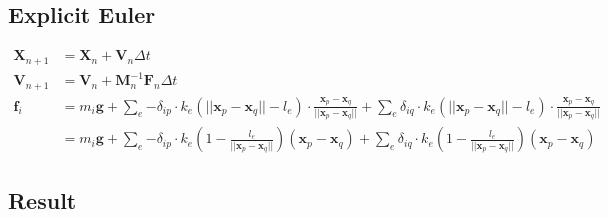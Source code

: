 \documentclass{article}
\begin{document}
\subsection*{Explicit Euler}
\begin{equation*}
  \begin{aligned}
    \bm{X}_{n+1} &= \bm{X}_n + \bm{V}_n\Delta t \\
    \bm{V}_{n+1} &= \bm{V}_n + \bm{M}_n^{-1}\bm{F}_n\Delta t \\
    \bm{f}_i &= m_i\bm{g} + \sum_e{-\delta_{ip}\cdot k_e(||\bm{x}_p-\bm{x}_q|| - l_e)\cdot \frac{\bm{x}_p-\bm{x}_q}{||\bm{x}_p-\bm{x}_q||}} + \sum_e{\delta_{iq}\cdot k_e(||\bm{x}_p-\bm{x}_q|| - l_e)\cdot \frac{\bm{x}_p-\bm{x}_q}{||\bm{x}_p-\bm{x}_q||}} \\
    &= m_i\bm{g} + \sum_e{-\delta_{ip}\cdot k_e(1 - \frac{l_e}{||\bm{x}_p-\bm{x}_q||})(\bm{x}_p-\bm{x}_q)} + \sum_e{\delta_{iq}\cdot k_e(1 - \frac{l_e}{||\bm{x}_p-\bm{x}_q||})(\bm{x}_p-\bm{x}_q)}
  \end{aligned}
\end{equation*}

\subsection*{Result}
\end{document}
